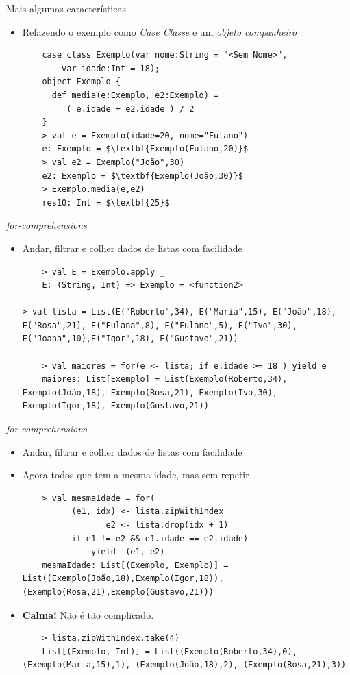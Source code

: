 \documentclass{beamer}
\begin{document}
\begin{frame}[fragile]{Mais algumas características} 
    \begin{itemize} %
        \item Refazendo o exemplo como \emph{Case Classe} e um \emph{objeto companheiro}
	\begin{lstlisting}
	case class Exemplo(var nome:String = "<Sem Nome>", 
		var idade:Int = 18); 
	object Exemplo {
	  def media(e:Exemplo, e2:Exemplo) =
	     ( e.idade + e2.idade ) / 2
	}
	> val e = Exemplo(idade=20, nome="Fulano")
	e: Exemplo = $\textbf{Exemplo(Fulano,20)}$
	> val e2 = Exemplo("João",30)
	e2: Exemplo = $\textbf{Exemplo(João,30)}$
	> Exemplo.media(e,e2)
	res10: Int = $\textbf{25}$
	\end{lstlisting}
    \end{itemize}
\end{frame}

\begin{frame}[fragile]{\emph{for-comprehensions}} 
    \begin{itemize} %
    \item Andar, filtrar e colher dados de listas com facilidade
	\begin{lstlisting}
	> val E = Exemplo.apply _
	E: (String, Int) => Exemplo = <function2>
	
> val lista = List(E("Roberto",34), E("Maria",15), E("João",18), E("Rosa",21), E("Fulana",8), E("Fulano",5), E("Ivo",30), E("Joana",10),E("Igor",18), E("Gustavo",21))
	
	> val maiores = for(e <- lista; if e.idade >= 18 ) yield e
	maiores: List[Exemplo] = List(Exemplo(Roberto,34), Exemplo(João,18), Exemplo(Rosa,21), Exemplo(Ivo,30), Exemplo(Igor,18), Exemplo(Gustavo,21))	
	\end{lstlisting}
    \end{itemize}
\end{frame}

\begin{frame}[fragile]{\emph{for-comprehensions}} 
    \begin{itemize} %
	\item Andar, filtrar e colher dados de listas com facilidade
	\item<1-> Agora todos que tem a mesma idade, mas sem repetir
	\begin{lstlisting}
	> val mesmaIdade = for(
	      (e1, idx) <- lista.zipWithIndex
	             e2 <- lista.drop(idx + 1)
	      if e1 != e2 && e1.idade == e2.idade) 
	          yield  (e1, e2)
	mesmaIdade: List[(Exemplo, Exemplo)] = List((Exemplo(João,18),Exemplo(Igor,18)), (Exemplo(Rosa,21),Exemplo(Gustavo,21)))
	\end{lstlisting}

	\item \textbf{Calma!} Não é tão complicado.
	\begin{lstlisting}
	> lista.zipWithIndex.take(4)
	List[(Exemplo, Int)] = List((Exemplo(Roberto,34),0), (Exemplo(Maria,15),1), (Exemplo(João,18),2), (Exemplo(Rosa,21),3))
	\end{lstlisting}
    \end{itemize}
\end{frame}
\end{document}
